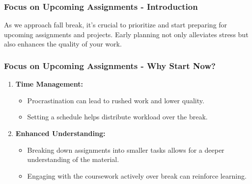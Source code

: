 \documentclass[aspectratio=169]{beamer}
\begin{document}
\begin{frame}[fragile]
    \frametitle{Focus on Upcoming Assignments - Introduction}
    As we approach fall break, it's crucial to prioritize and start preparing for upcoming assignments and projects. Early planning not only alleviates stress but also enhances the quality of your work.
\end{frame}

\begin{frame}[fragile]
    \frametitle{Focus on Upcoming Assignments - Why Start Now?}
    \begin{enumerate}
        \item \textbf{Time Management:} 
            \begin{itemize}
                \item Procrastination can lead to rushed work and lower quality.
                \item Setting a schedule helps distribute workload over the break.
            \end{itemize}
        \item \textbf{Enhanced Understanding:}
            \begin{itemize}
                \item Breaking down assignments into smaller tasks allows for a deeper understanding of the material.
                \item Engaging with the coursework actively over break can reinforce learning.
            \end{itemize}
    \end{enumerate}
\end{frame}
\end{document}
